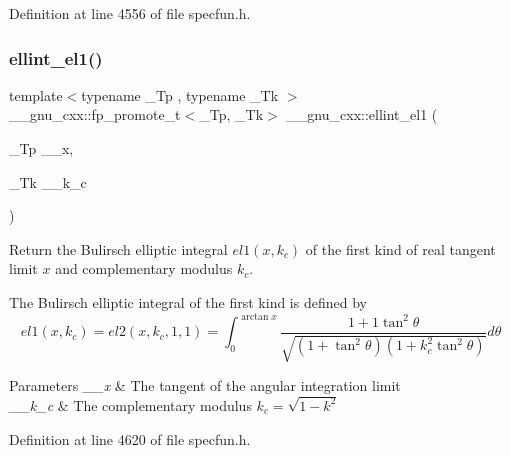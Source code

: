 Definition at line 4556 of file specfun.\+h.

\mbox{\label{group__gnu__math__spec__func_ga510b1e51e7d3bc937ed1b4c2f57492e4}} 
\subsubsection{\texorpdfstring{ellint\+\_\+el1()}{ellint\_el1()}}
{\footnotesize\ttfamily template$<$typename \+\_\+\+Tp , typename \+\_\+\+Tk $>$ \\
\+\_\+\+\_\+gnu\+\_\+cxx\+::fp\+\_\+promote\+\_\+t$<$\+\_\+\+Tp, \+\_\+\+Tk$>$ \+\_\+\+\_\+gnu\+\_\+cxx\+::ellint\+\_\+el1 (\begin{DoxyParamCaption}\item[{\+\_\+\+Tp}]{\+\_\+\+\_\+x,  }\item[{\+\_\+\+Tk}]{\+\_\+\+\_\+k\+\_\+c }\end{DoxyParamCaption})\hspace{0.3cm}{\ttfamily [inline]}}

Return the Bulirsch elliptic integral $ el1(x,k_c) $ of the first kind of real tangent limit $ x $ and complementary modulus $ k_c $.

The Bulirsch elliptic integral of the first kind is defined by \[ el1(x,k_c) = el2(x,k_c,1,1) = \int_0^{\arctan x} \frac{1+1\tan^2\theta} {\sqrt{(1+\tan^2\theta)(1+k_c^2\tan^2\theta)}}d\theta \]


\begin{DoxyParams}{Parameters}
{\em \+\_\+\+\_\+x} & The tangent of the angular integration limit \\
\hline
{\em \+\_\+\+\_\+k\+\_\+c} & The complementary modulus $ k_c = \sqrt{1 - k^2} $ \\
\hline
\end{DoxyParams}


Definition at line 4620 of file specfun.\+h.

\mbox{\label{group__gnu__math__spec__func_ga8d8342bb4f42c7fe09b5589c54d4e713}} 
